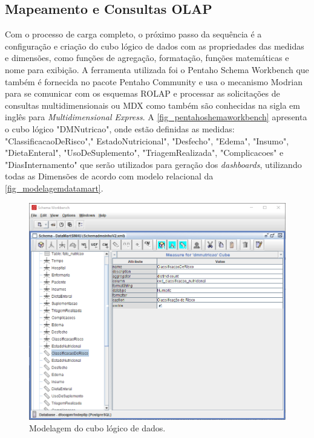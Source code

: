 \subsection{Mapeamento e Consultas OLAP}
Com o processo de carga completo, o próximo passo da sequência é a configuração e criação do cubo lógico de dados com as propriedades das medidas e dimensões, como funções de agregação, formatação, funções matemáticas e nome para exibição. A ferramenta utilizada foi o Pentaho Schema Workbench que também é fornecida no pacote Pentaho Community e usa o mecanismo Modrian para se comunicar com os esquemas ROLAP e processar as solicitações de consultas multidimensionais ou MDX como também são conhecidas na sigla em inglês para \textit{Multidimensional Express}. A \autoref{fig_pentahoshemaworkbench} apresenta o cubo lógico "DMNutricao", onde estão definidas as medidas: "ClassificacaoDeRisco"," EstadoNutricional", "Desfecho", "Edema", "Insumo", "DietaEnteral", "UsoDeSuplemento", "TriagemRealizada", "Complicacoes" e "DiasInternamento" que serão utilizados para geração dos \textit{dashboards}, utilizando todas as Dimensões de acordo com modelo relacional da \autoref{fig_modelagemdatamart}.

\begin{figure}[htb]
	\caption{\label{fig_pentahoshemaworkbench}Modelagem do cubo lógico de dados.}
	\begin{center}
	    \includegraphics[scale=0.65]{Imagens/figura - schema workbench.png}
	\end{center}
\end{figure}

